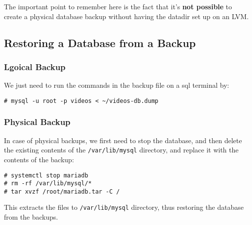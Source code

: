 \noindent
The important point to remember here is the fact that it's \textbf{not possible} to create a physical database backup without having the datadir set up on an LVM. 

\subsection{Restoring a Database from a Backup}
\subsubsection{Lgoical Backup}
We just need to run the commands in the backup file on a sql terminal by:

\vspace{-15pt}
\begin{verbatim}
# mysql -u root -p videos < ~/videos-db.dump
\end{verbatim}
\vspace{-10pt}	

\subsubsection{Physical Backup}
In case of physical backups, we first need to stop the database, and then delete the existing contents of the \verb|/var/lib/mysql| directory, and replace it with the contents of the backup:

\vspace{-15pt}
\begin{verbatim}
# systemctl stop mariadb
# rm -rf /var/lib/mysql/*
# tar xvzf /root/mariadb.tar -C /
\end{verbatim}
\vspace{-10pt}	

\noindent
This extracts the files to \verb|/var/lib/mysql| directory, thus restoring the database from the backups.
